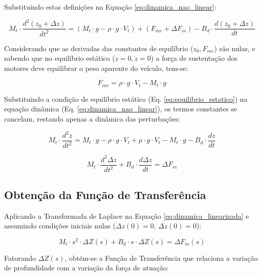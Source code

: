 \documentclass[12pt, a4paper]{article}
\begin{document}
			Substituindo estas definições na Equação \ref{eq:dinamica_nao_linear}:

			\begin{equation}
				M_t \cdot \frac{d^2(z_0 + \Delta z)}{dt^2} = (M_t \cdot g - \rho \cdot g \cdot V_t) + (F_{me} + \Delta F_m) - B_d \cdot \frac{d(z_0 + \Delta z)}{dt}
			\end{equation}

			Considerando que as derivadas das constantes de equilíbrio ($z_0, F_{me}$) são nulas, e sabendo que no equilíbrio estático ($\dot{z}=0, \ddot{z}=0$) a força de sustentação dos motores deve equilibrar o peso aparente do veículo, tem-se:

			\begin{equation}
				F_{me} = \rho \cdot g \cdot V_t - M_t \cdot g
				\label{eq:equilibrio_estatico}
			\end{equation}

			Substituindo a condição de equilíbrio estático (Eq. \ref{eq:equilibrio_estatico}) na equação dinâmica (Eq. \ref{eq:dinamica_nao_linear}), os termos constantes se cancelam, restando apenas a dinâmica das perturbações:

			\begin{equation}
				M_t \cdot \frac{d^2z}{dt^2} = M_t \cdot g - \rho \cdot g \cdot V_t + \rho \cdot g \cdot V_t - M_t \cdot g - B_d \cdot \frac{dz}{dt}
				\label{eq:dinamica_linearizada_intermediaria}
			\end{equation}

			\begin{equation}
				M_t \cdot \frac{d^2 \Delta z}{dt^2} + B_d \cdot \frac{d \Delta z}{dt} = \Delta F_{m}
				\label{eq:dinamica_linearizada}
			\end{equation}

		\subsection{Obtenção da Função de Transferência}

			Aplicando a Transformada de Laplace na Equação \ref{eq:dinamica_linearizada} e assumindo condições iniciais nulas ($\Delta z(0) = 0$, $\Delta \dot{z}(0) = 0$):

			\begin{equation}
				M_t \cdot s^2 \cdot \Delta Z(s) + B_d \cdot s \cdot \Delta Z(s) = \Delta F_{m}(s)
			\end{equation}

			Fatorando $\Delta Z(s)$, obtém-se a Função de Transferência que relaciona a variação de profundidade com a variação da força de atuação:
\end{document}
